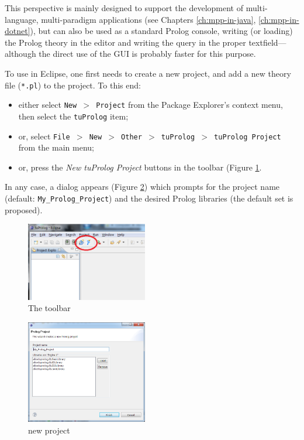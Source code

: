 This perspective is mainly designed to support the development of multi-language, multi-paradigm applications (see Chapters \ref{ch:mpp-in-java}, \ref{ch:mpp-in-dotnet}), but can also be used as a standard Prolog console, writing (or loading) the Prolog theory in the editor and writing the query in the proper textfield---although the direct use of the \tuprolog{} GUI is probably faster for this purpose.

To use \tuprolog{} in Eclipse, one first needs to create a new \tuprolog{} project, and add a new theory file (\texttt{*.pl}) to the project.
%
To this end:%
\begin{itemize}
  \item either select \texttt{New $>$ Project} from the Package Explorer's context menu, then select the \texttt{tuProlog} item;
  \item or, select \texttt{File $>$ New $>$ Other $>$ tuProlog $>$ tuProlog Project} from the main menu;
  \item or, press the \textit{New tuProlog Project} buttons in the \tuprolog{} toolbar (Figure \ref{fig:plugin1}.
\end{itemize}

In any case, a dialog appears (Figure \ref{fig:plugin2}) which prompts for the project name (default: \texttt{My\_Prolog\_Project}) and the desired Prolog libraries (the default set is proposed).

\begin{figure}
\centering
  \includegraphics[width=200px]{images/plugin1.png}
  \caption{The \tuprolog{} toolbar}\label{fig:plugin1}
\end{figure}

\begin{figure}
\centering
  \includegraphics[width=200px]{images/plugin2.png}
  \caption{new \tuprolog{} project}\label{fig:plugin2}
\end{figure}

